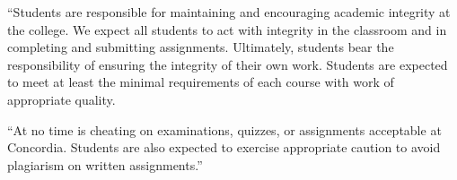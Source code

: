 \documentclass{tufte-handout}
\begin{document}

``Students are responsible for maintaining and encouraging academic integrity at the college. We expect all students to act with integrity in the classroom and in completing and submitting assignments. Ultimately, students bear the responsibility of ensuring the integrity of their own work. Students are expected to meet at least the minimal requirements of each course with work of appropriate quality. 


``At no time is cheating on examinations, quizzes, or assignments acceptable at Concordia. Students are also expected to exercise appropriate caution to avoid plagiarism on written assignments.''
\end{document}
